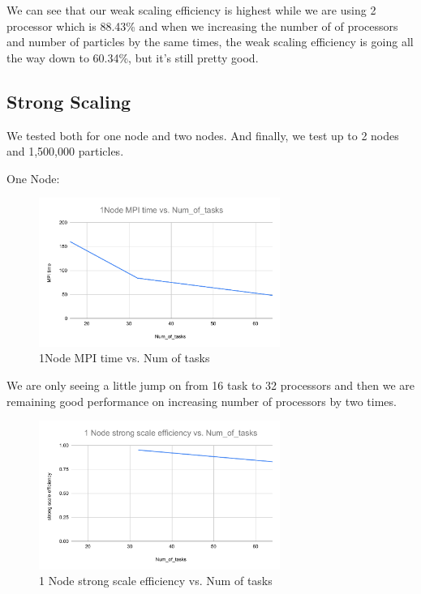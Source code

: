 \documentclass{article}
\begin{document}
We can see that our weak scaling efficiency is highest while we are using 2 processor which is 88.43\% and when we increasing the number of of processors and number of particles by the same times, the weak scaling efficiency is going all the way down to 60.34\%, but it's still pretty good.

\subsection{Strong Scaling}
We tested both for one node and two nodes. And finally, we test up to 2 nodes and 1,500,000 particles.

One Node:
\begin{figure}[H] %
\centering %
\includegraphics[width=0.7\textwidth]{figures/1Node MPI time vs. Num_of_tasks.pdf} %
\caption{1Node MPI time vs. Num of tasks} %
\label{1Node MPI time vs. Num_of_tasks} %
\end{figure}
We are only seeing a little jump on from 16 task to 32 processors and then we are remaining good performance on increasing number of processors by two times.

\begin{figure}[H] %
\centering %
\includegraphics[width=0.7\textwidth]{figures/1 Node strong scale efficiency vs. Num_of_tasks.pdf} %
\caption{1 Node strong scale efficiency vs. Num of tasks} %
\label{1 Node strong scale efficiency vs. Num_of_tasks} %
\end{figure}
\end{document}
